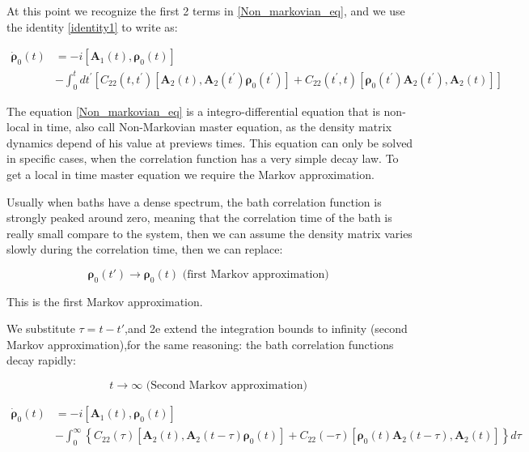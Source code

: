\documentclass[%
preprint,
onecolumn,
notitlepag,
 amsmath,amssymb,
 aps,
 pra,
]{revtex4-2}
\begin{document}
\begin{itemize}
At this point we recognize the first 2 terms in \eqref{Non_markovian_eq}, and we use the identity \eqref{identity1} to write as: 

\begin{equation}
\begin{aligned}
\dot{\boldsymbol{\rho}}_0(t) &=  -i \left[ \boldsymbol{A}_1(t) , \boldsymbol{\rho}_0(t) \right] \\
& - \int_{0}^{t} d t^{\prime}\left[C_{22}\left(t, t^{\prime}\right)\left[\boldsymbol{A}_2(t), \boldsymbol{A}_2\left(t^{\prime}\right) \boldsymbol{\rho}_0 \left(t^{\prime}\right)\right] +C_{22}\left(t^{\prime}, t\right)\left[\boldsymbol{\rho}_0 \left(t^{\prime}\right) \boldsymbol{A}_2 \left(t^{\prime}\right), \boldsymbol{A}_2 (t)\right]\right] 
\end{aligned}
\label{Non_markovian_eq}
\end{equation}





The equation \ref{Non_markovian_eq} is a integro-differential equation that is non-local in time, also call Non-Markovian master equation, as the density matrix dynamics depend of  his value at previews times. This equation can only be solved in specific cases, when the correlation function has a very simple decay law. To get a local in time master equation we require  the Markov approximation.

Usually when baths have a dense spectrum, the bath correlation function is strongly peaked around zero, meaning that the correlation time of the bath is really small compare to the system, then we can assume the density matrix varies slowly during the correlation time, then  we can replace: 


\begin{equation}
\boldsymbol{\rho}_0(t') \rightarrow \boldsymbol{\rho}_0(t) \text { (first Markov approximation) }
\end{equation}

This is the first Markov approximation.  

We substitute $\tau=t-t'$,and 2e extend the integration bounds
to infinity (second Markov approximation),for the same reasoning: the bath correlation
functions decay rapidly: 

\begin{equation}
t \rightarrow \infty \text { (Second Markov approximation) }
\end{equation}


\begin{equation}
\begin{aligned}
\dot{\boldsymbol{\rho}}_0(t) &=  -i \left[ \boldsymbol{A}_1(t) , \boldsymbol{\rho}_0(t) \right] \\
& - \int_{0}^{\infty}\left\{C_{22}(\tau)\left[\boldsymbol{A}_2(t), \boldsymbol{A}_2(t-\tau) \boldsymbol{\rho}_{\mathrm{0}}(t)\right]+C_{22}(-\tau)\left[\boldsymbol{\rho}_{\mathrm{0}}(t) \boldsymbol{A}_2(t-\tau), \boldsymbol{A}_2(t)\right]\right\} d \tau
\end{aligned}
\label{Non_markovian_eq}
\end{equation}







\end{itemize}
\end{document}

